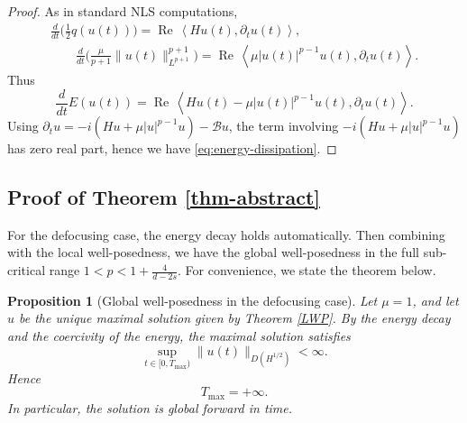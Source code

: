 \documentclass[10pt%
]{amsart}
\numberwithin{equation}{section}
\newcommand{\Ree}{\operatorname{Re}}
\newcommand{\ip}[2]{\left\langle #1,#2\right\rangle}
\newtheorem{assumption}{Assumption}[section]
\newtheorem{proposition}[theorem]{Proposition}
\theoremstyle{definition}
\begin{document}
\begin{proof}
	As in standard NLS computations,
	\begin{gather*}
		\frac{d}{dt}\Big(\tfrac12 q(u(t))\Big)
		=
		\Ree\,\ip{Hu(t)}{\partial_t u(t)},\\
		\qquad
		\frac{d}{dt}\Big(\tfrac{\mu}{p+1}\|u(t)\|_{L^{p+1}}^{p+1}\Big)
		=
		\Ree\,\ip{\mu |u(t)|^{p-1}u(t)}{\partial_t u(t)}.
	\end{gather*}
	Thus
	\[
	\frac{d}{dt}E(u(t))
	=
	\Ree\,\ip{Hu(t)-\mu |u(t)|^{p-1}u(t)}{\partial_t u(t)}.
	\]
	Using $\partial_t u=-i(Hu+\mu |u|^{p-1}u)-\mathcal Bu$, the term involving
	$-i(Hu+\mu |u|^{p-1}u)$ has zero real part, hence we have \eqref{eq:energy-dissipation}.
\end{proof}
%
%





\subsection{Proof of Theorem \ref{thm-abstract}}

For the defocusing case,  the energy decay holds automatically. Then combining with the local well-posedness, we have the  global well-posedness in the full sub-critical range $1<p<1+\frac{4}{d-2s}$. For convenience, we state the theorem below.


\begin{proposition}[Global well-posedness in the defocusing case]
		Let $\mu=1$, and let $u$ be the unique maximal solution given by Theorem \ref{LWP}.
		By the energy decay and the coercivity of the energy, the maximal solution satisfies
		\[
		\sup_{t\in[0,T_{\max})}\|u(t)\|_{D(H^{1/2})}<\infty.
		\]
		Hence
		\[
		T_{\max}=+\infty.
		\]
		In particular, the solution is global forward in time.
\end{proposition}
\end{document}
